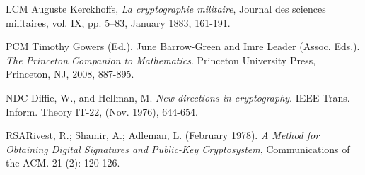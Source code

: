 \documentclass[12pt]{article}
\begin{document}



\begin{thebibliography}{9}
\bibitem
{LCM} Auguste Kerckhoffs, \emph{La cryptographie militaire}, Journal des sciences militaires, vol. IX, pp. 5–83, January 1883, 161-191.

\bibitem
{PCM} Timothy Gowers (Ed.), June Barrow-Green and Imre Leader (Assoc. Eds.). \emph{The Princeton Companion to Mathematics}. Princeton University Press, Princeton, NJ, 2008, 887-895.

\bibitem
{NDC} Diffie, W., and Hellman, M. \emph{New directions in cryptography}. IEEE Trans. Inform. Theory IT-22, (Nov. 1976), 644-654.

\bibitem
{RSA}Rivest, R.; Shamir, A.; Adleman, L. (February 1978). \emph{A Method for Obtaining Digital Signatures and Public-Key Cryptosystem}, Communications of the ACM. 21 (2): 120-126.


\end{thebibliography}
\end{document}
